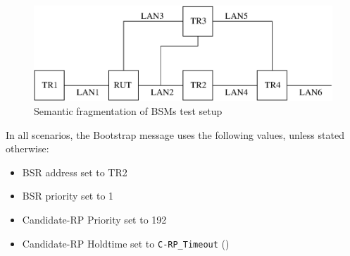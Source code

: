 \documentclass[11pt]{report}
\begin{document}
\begin{figure}[htbp]
  \begin{center}
    \includegraphics[scale=0.8]{figs/pim_test_6_7_semantic_fragmentation_of_bsms}
    \caption{Semantic fragmentation of BSMs test setup}
    \label{fig:pim_test_6_7_semantic_fragmentation_of_bsms}
  \end{center}
\end{figure}


In all scenarios, the Bootstrap message uses the following values, unless
stated otherwise:

\begin{itemize}
  \item BSR address set to TR2
  \item BSR priority set to 1
  \item Candidate-RP Priority set to 192
  \item Candidate-RP Holdtime set to \verb=C-RP_Timeout= ({\PimsmCRPTimeout})
\end{itemize}

\end{document}
